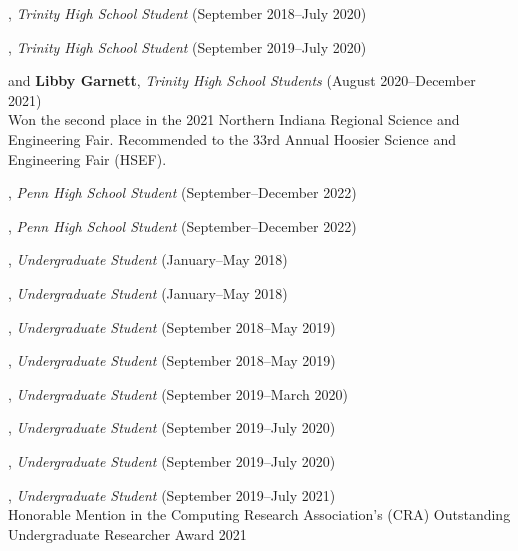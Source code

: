 \documentclass[10pt]{article}
\newenvironment{myindentpar}[1]%
{\begin{list}{}%
         {\setlength{\leftmargin}{#1}}%
         \item[]%
}
{\end{list}}
\newcounter{list}
\begin{document}
\begin{myindentpar}{0.75cm}

\hspace{-0.75cm}{\bf Eric Zhang}, \textit{Trinity High School Student} (September 2018--July 2020)

\hspace{-0.75cm}{\bf Michael Florin}, \textit{Trinity High School Student} (September 2019--July 2020)

\hspace{-0.75cm}{\bf Rebekah Fang} and {\bf Libby Garnett}, \textit{Trinity High School Students} (August 2020--December 2021) \\
	Won the second place in the 2021 Northern Indiana Regional Science and Engineering Fair. Recommended to the 33rd Annual Hoosier Science and Engineering Fair (HSEF).

\hspace{-0.75cm}{\bf Ishita Masetty}, \textit{Penn High School Student} (September--December 2022)

\hspace{-0.75cm}{\bf Jake Ciliberti}, \textit{Penn High School Student} (September--December 2022)

\hspace{-0.75cm}{\bf Matthew Malir}, \textit{Undergraduate Student} (January--May 2018)
	
\hspace{-0.75cm}{\bf Sebastian Miner}, \textit{Undergraduate Student} (January--May 2018)

\hspace{-0.75cm}{\bf Matthew Schoenbauer}, \textit{Undergraduate Student} (September 2018--May 2019)
	
\hspace{-0.75cm}{\bf Yuhan (Tina) Wu}, \textit{Undergraduate Student} (September 2018--May 2019)

\hspace{-0.75cm}{\bf Chan Hee Song}, \textit{Undergraduate Student} (September 2019--March 2020)

\hspace{-0.75cm}{\bf Xiangyu Dong}, \textit{Undergraduate Student} (September 2019--July 2020)

\hspace{-0.75cm}{\bf Tianze Zheng}, \textit{Undergraduate Student} (September 2019--July 2020)

\hspace{-0.75cm}{\bf Bo Ni}, \textit{Undergraduate Student} (September 2019--July 2021) \\
	Honorable Mention in the Computing Research Association's (CRA) Outstanding Undergraduate Researcher Award 2021


\end{myindentpar}
\end{document}
